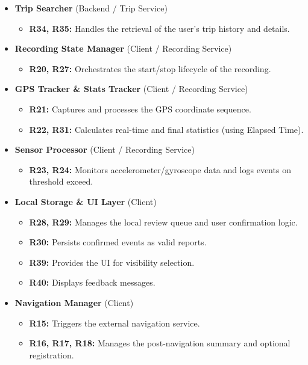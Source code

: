 \begin{itemize}
    \item \textbf{Trip Searcher} (Backend / Trip Service)
    \begin{itemize}
        \item \textbf{R34, R35:} Handles the retrieval of the user's trip history and details.
    \end{itemize}

    \item \textbf{Recording State Manager} (Client / Recording Service)
    \begin{itemize}
        \item \textbf{R20, R27:} Orchestrates the start/stop lifecycle of the recording.
    \end{itemize}

    \item \textbf{GPS Tracker \& Stats Tracker} (Client / Recording Service)
    \begin{itemize}
        \item \textbf{R21:} Captures and processes the GPS coordinate sequence.
        \item \textbf{R22, R31:} Calculates real-time and final statistics (using Elapsed Time).
    \end{itemize}

    \item \textbf{Sensor Processor} (Client / Recording Service)
    \begin{itemize}
        \item \textbf{R23, R24:} Monitors accelerometer/gyroscope data and logs events on threshold exceed.
    \end{itemize}

    \item \textbf{Local Storage \& UI Layer} (Client)
    \begin{itemize}
        \item \textbf{R28, R29:} Manages the local review queue and user confirmation logic.
        \item \textbf{R30:} Persists confirmed events as valid reports.
        \item \textbf{R39:} Provides the UI for visibility selection.
        \item \textbf{R40:} Displays feedback messages.
    \end{itemize}

    \item \textbf{Navigation Manager} (Client)
    \begin{itemize}
        \item \textbf{R15:} Triggers the external navigation service.
        \item \textbf{R16, R17, R18:} Manages the post-navigation summary and optional registration.
    \end{itemize}
\end{itemize}

